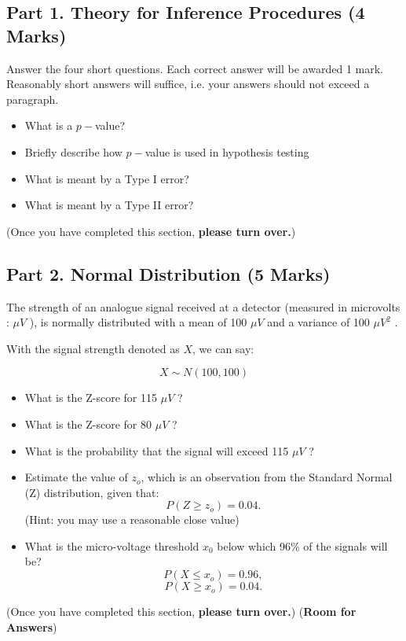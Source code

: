 \documentclass[a4paper,12pt]{article}
\begin{document}
\subsection*{Part 1. Theory for Inference Procedures (4 Marks)}
Answer the four short questions. Each correct answer will be awarded 1 mark. Reasonably short answers will suffice, i.e. your answers should not exceed a paragraph.
\begin{itemize}
\item  What is a $p-$value?
\item  Briefly describe how $p-$value is used in hypothesis testing
\item  What is meant by a Type I error?
\item   What is meant by a Type II error?
\end{itemize}
(Once you have completed this section, \textbf{please turn over.})
\newpage
\subsection*{Part 2. Normal Distribution (5 Marks)}
The strength of an analogue signal received at a detector (measured in microvolts : $\mu V$ ), is normally distributed with a mean of 100 $\mu V$  
and a variance of 100 $\mu V^2$ . 


\noindent With the signal strength denoted as $X$, we can say:

\[ X \sim N(100,100) \]

\begin{itemize}
\item  What is the Z-score for 115 $\mu V$ ? 
\item  What is the Z-score for 80 $\mu V$ ?
\item  What is the probability that the signal will exceed 115 $\mu V$ ? 
\item   Estimate the value of $z_o$, which is an observation from the Standard Normal (Z) distribution, given that:
\[  P(Z \geq z_o) = 0.04.\] 
(Hint: you may use a reasonable close value)
\item   What is the micro-voltage threshold $x_0$ below which 96\% of the signals will be? 
\[  P(X \leq x_o) = 0.96,\] 
\[  P(X \geq x_o) = 0.04.\]
\end{itemize}
(Once you have completed this section, \textbf{please turn over.})
\newpage
(\textbf{Room for Answers})
\end{document}
